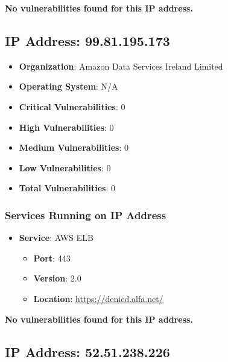 \documentclass{article}
\begin{document}
\textbf{No vulnerabilities found for this IP address.}




\clearpage



\subsection*{IP Address: 99.81.195.173}

\begin{itemize}
    \item \textbf{Organization}: Amazon Data Services Ireland Limited
    \item \textbf{Operating System}:  N/A 
    \item \textbf{Critical Vulnerabilities}: 0
    \item \textbf{High Vulnerabilities}: 0
    \item \textbf{Medium Vulnerabilities}: 0
    \item \textbf{Low Vulnerabilities}: 0
    \item \textbf{Total Vulnerabilities}: 0
\end{itemize}

\subsubsection*{Services Running on IP Address}

\begin{itemize}
    
        \item \textbf{Service}: AWS ELB
        \begin{itemize}
            \item \textbf{Port}: 443
            \item \textbf{Version}:  2.0 
            \item \textbf{Location}: \href{ https://denied.alfa.net/ }{ https://denied.alfa.net/ }
        \end{itemize}
    
\end{itemize}


\textbf{No vulnerabilities found for this IP address.}




\clearpage



\subsection*{IP Address: 52.51.238.226}
\end{document}
